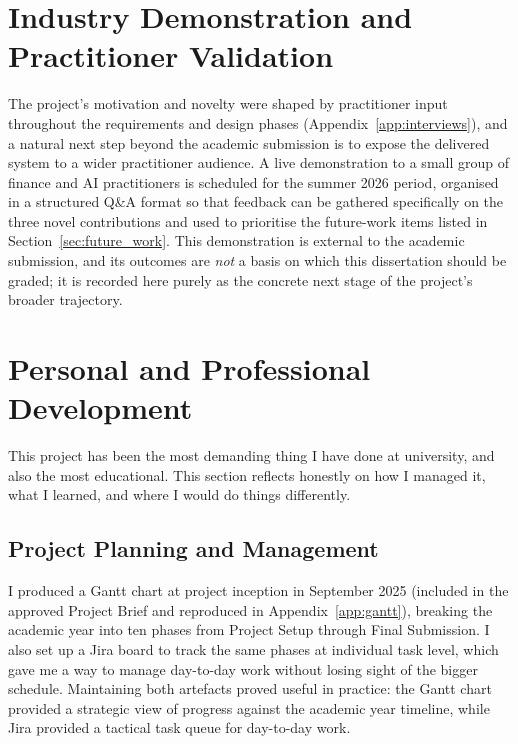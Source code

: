\section{Industry Demonstration and Practitioner Validation}
\label{sec:industry_demo}

The project's motivation and novelty were shaped by practitioner input throughout the requirements and design phases (Appendix~\ref{app:interviews}), and a natural next step beyond the academic submission is to expose the delivered system to a wider practitioner audience. A live demonstration to a small group of finance and AI practitioners is scheduled for the summer 2026 period, organised in a structured Q\&A format so that feedback can be gathered specifically on the three novel contributions and used to prioritise the future-work items listed in Section~\ref{sec:future_work}. This demonstration is external to the academic submission, and its outcomes are \emph{not} a basis on which this dissertation should be graded; it is recorded here purely as the concrete next stage of the project's broader trajectory.

\section{Personal and Professional Development}
\label{sec:ppd}

This project has been the most demanding thing I have done at university, and also the most educational. This section reflects honestly on how I managed it, what I learned, and where I would do things differently.

\subsection{Project Planning and Management}

I produced a Gantt chart at project inception in September 2025 (included in the approved Project Brief and reproduced in Appendix~\ref{app:gantt}), breaking the academic year into ten phases from Project Setup through Final Submission. I also set up a Jira board to track the same phases at individual task level, which gave me a way to manage day-to-day work without losing sight of the bigger schedule. Maintaining both artefacts proved useful in practice: the Gantt chart provided a strategic view of progress against the academic year timeline, while Jira provided a tactical task queue for day-to-day work.

